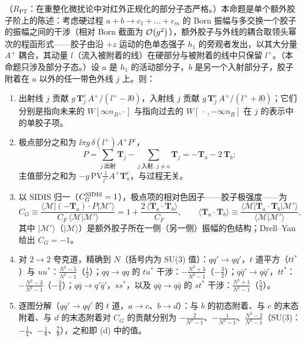 \begin{proposition}\label{prop:break-colour}
（$R_{\mathrm{PT}}$：在重整化微扰论中对红外正规化的部分子态严格。）本命题是单个额外胶子阶上的陈述：考虑硬过程 $a+b\to c_1+\dots+c_m$ 的 Born 振幅与多交换一个胶子的振幅之间的干涉（相对 Born 截面为 $\mathcal{O}\!\left(g^2\right)$），额外胶子与外线的耦合取领头幂次的程函形式——胶子由沿 $+z$ 运动的色单态强子 $h_1$ 的旁观者发出，以其大分量 $A^+$ 耦合，其动量 $l$（流入被附着的线）在硬部分与被附着的线中只保留 $l^+$。（本命题只涉及部分子态。）设 $a$ 是 $h_1$ 的活动部分子，$b$ 是另一个入射部分子，胶子附着在 $a$ 以外的任一带色外线 $j$ 上。则：
\begin{enumerate}[label=(\alph*),leftmargin=2.2em,itemsep=1pt,topsep=2pt]
\item 出射线 $j$ 贡献 $g\,\mathbf T_j^e\,A^+/(l^+-\ii0)$，入射线 $j$ 贡献 $g\,\mathbf T_j^e\,A^+/(l^++\ii0)$；它们分别是指向未来的 $W[\infty n_B,\cdot\,]$ 与指向过去的 $W[\,\cdot\,,-\infty n_B]$ 在 $j$ 的表示中的单胶子项。
\item 极点部分之和为 $\ii\pi g\,\delta(l^+)A^+P^e$，
\begin{equation}\label{eq:break-P}
P=\sum_{j\ \text{出射}}\mathbf T_j-\sum_{j\ \text{入射},\,j\neq a}\mathbf T_j=-\mathbf T_a-2\,\mathbf T_b ;
\end{equation}
主值部分之和为 $-g\,\mathrm{PV}\frac{1}{l^+}A^+\mathbf T_a^e$，与过程无关。
\item 以 SIDIS 归一（$C_G^{\rm SIDIS}=1$），极点项的相对色因子——胶子极强度——为
\begin{equation}\label{eq:break-CG}
C_G\equiv\frac{\langle\mathcal M|(-\mathbf T_a)\cdot P|\mathcal M'\rangle}{C_F\,\langle\mathcal M|\mathcal M'\rangle}=1+\frac{2\,\langle\mathbf T_a\cdot\mathbf T_b\rangle}{C_F},\qquad
\langle\mathbf T_a\cdot\mathbf T_b\rangle\equiv\frac{\langle\mathcal M|\mathbf T_a\cdot\mathbf T_b|\mathcal M'\rangle}{\langle\mathcal M|\mathcal M'\rangle},
\end{equation}
其中 $|\mathcal M'\rangle$（$|\mathcal M\rangle$）是额外胶子所在一侧（另一侧）振幅的色结构；Drell--Yan 给出 $C_G=-1$。
\item 对 $2\to2$ 夸克道，精确到 $N$（括号内为 SU(3) 值）：$qq'\to qq'$，$t$ 道平方（$tt^*$）与 $uu^*$：$\frac{N^2-5}{N^2-1}$（$\frac12$）；$qq\to qq$ 的 $tu^*$ 干涉：$-\frac{N^2+3}{N^2-1}$（$-\frac32$）；$q\bar q'\to q\bar q'$，$tt^*$：$-\frac{N^2-3}{N^2-1}$（$-\frac34$）；$q\bar q\to q'\bar q'$，$ss^*$，以及 $q\bar q\to q\bar q$ 的 $st^*$ 干涉：$\frac{N^2+1}{N^2-1}$（$\frac54$）。
\item 逐图分解（$qq'\to qq'$ 的 $t$ 道，$a\to c$、$b\to d$）：与 $b$ 的初态附着、与 $c$ 的末态附着、与 $d$ 的末态附着对 $C_G$ 的贡献分别为 $-\frac{2}{N^2-1}$、$-\frac{1}{N^2-1}$、$\frac{N^2-2}{N^2-1}$（SU(3)：$-\frac14$、$-\frac18$、$\frac78$），之和即 (d) 中的值。
\end{enumerate}
\end{proposition}

